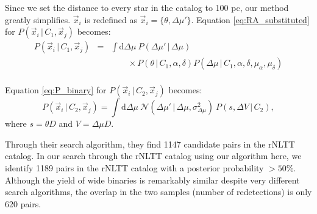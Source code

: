 \documentclass[usenatbib]{mnras}
\newcommand{\given}{\,|\,}
\newcommand{\dd}{\mathrm{d}}
\begin{document}
Since we set the distance to every star in the catalog to 100 pc, our method greatly simplifies. $\vec{x}_i$ is redefined as $\vec{x}_i = \{ \theta, \Delta \mu' \}$. Equation \ref{eq:RA_substituted} for $P(\vec{x}_i \given C_1, \vec{x}_j)$ becomes:
\begin{eqnarray}
P(\vec{x}_i \given C_1, \vec{x}_j) &=& \int \dd \Delta \mu\ P(\Delta \mu' \given \Delta \mu)\nonumber \\
& & \qquad \times P(\theta \given C_1, \alpha, \delta) P(\Delta \mu \given C_1, \alpha, \delta, \mu_{\alpha}, \mu_{\delta}) \nonumber \\
\label{eq:P_random_NLTT}
\end{eqnarray}


Equation \ref{eq:P_binary} for $P(\vec{x}_i \given C_2, \vec{x}_j)$ becomes:
\begin{equation}
P(\vec{x}_i \given C_2, \vec{x}_j) = \int \dd \Delta \mu\ 
\mathcal{N}( \Delta \mu' \given \Delta \mu, \sigma^2_{\Delta \mu} )\
P(s, \Delta V \given C_2),
\label{eq:P_binary_rNLTT}
\end{equation}
where $s = \theta D$ and $V = \Delta \mu D$. 


Through their search algorithm, they find 1147 candidate pairs in the rNLTT catalog. In our search through the rNLTT catalog using our algorithm here, we identify 1189 pairs in the rNLTT catalog with a posterior probability $>50$\%. Although the yield of wide binaries is remarkably similar despite very different search algorithms, the overlap in the two samples (number of redetections) is only 620 pairs. 



\end{document}
